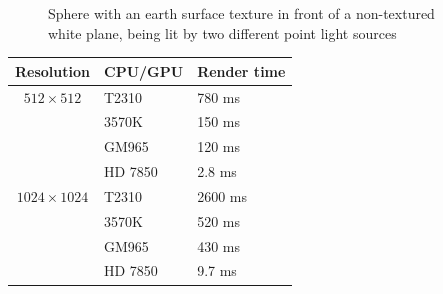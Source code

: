 \documentclass[english,fleqn,10pt,twocolumn]{article}
\begin{document}
\begin{figure}[ht]
    \centering {}
    \caption{Sphere with an earth surface texture in front of a non-textured white plane, being lit by two different point light sources}
    \label{fig2}
\end{figure}

\begin{tabular}{c|ll}
    Resolution         & CPU/GPU     & Render time \\ \hline \hline
    $ 512 \times  512$ & T2310       & 780 ms      \\ \cline{2-3}
                       & 3570K       & 150 ms      \\ \cline{2-3}
                       & GM965       & 120 ms      \\ \cline{2-3}
                       & HD 7850     & 2.8 ms      \\ \hline \hline
    $1024 \times 1024$ & T2310       & 2600 ms     \\ \cline{2-3}
                       & 3570K       & 520 ms      \\ \cline{2-3}
                       & GM965       & 430 ms      \\ \cline{2-3}
                       & HD 7850     & 9.7 ms
\end{tabular}
\end{document}
